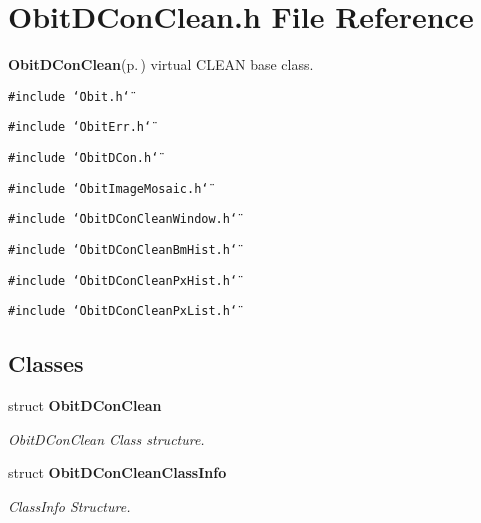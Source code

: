 \section{Obit\-DCon\-Clean.h File Reference}
\label{ObitDConClean_8h}
{\bf Obit\-DCon\-Clean}{\rm (p.\,\pageref{structObitDConClean})} virtual CLEAN base class. 

{\tt \#include \char`\"{}Obit.h\char`\"{}}\par
{\tt \#include \char`\"{}Obit\-Err.h\char`\"{}}\par
{\tt \#include \char`\"{}Obit\-DCon.h\char`\"{}}\par
{\tt \#include \char`\"{}Obit\-Image\-Mosaic.h\char`\"{}}\par
{\tt \#include \char`\"{}Obit\-DCon\-Clean\-Window.h\char`\"{}}\par
{\tt \#include \char`\"{}Obit\-DCon\-Clean\-Bm\-Hist.h\char`\"{}}\par
{\tt \#include \char`\"{}Obit\-DCon\-Clean\-Px\-Hist.h\char`\"{}}\par
{\tt \#include \char`\"{}Obit\-DCon\-Clean\-Px\-List.h\char`\"{}}\par
\subsection*{Classes}
\begin{CompactItemize}
\item 
struct {\bf Obit\-DCon\-Clean}
\begin{CompactList}\small\item\em Obit\-DCon\-Clean Class structure. \item\end{CompactList}\item 
struct {\bf Obit\-DCon\-Clean\-Class\-Info}
\begin{CompactList}\small\item\em Class\-Info Structure. \item\end{CompactList}\end{CompactItemize}
